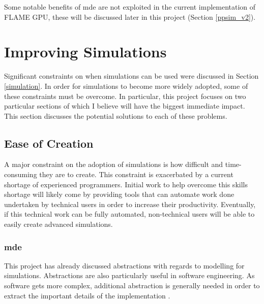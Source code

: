 \documentclass{UoYCSproject}
\begin{document}
Some notable benefits of \gls{mde} are not exploited in the current implementation of \gls{FLAME GPU}, these will be discussed later in this project (Section \ref{ppsim_v2}).

\section{Improving Simulations}
\label{improvements}
Significant constraints on when simulations can be used were discussed in Section \ref{simulation}.
In order for simulations to become more widely adopted, some of these constraints must be overcome. 
In particular, this project focuses on two particular sections of which I believe will have the biggest immediate impact.
This section discusses the potential solutions to each of these problems.

\subsection{Ease of Creation}
\label{ease-of-creation}
A major constraint on the adoption of simulations is how difficult and time-consuming they are to create.
This constraint is exacerbated by a current shortage of experienced programmers.
Initial work to help overcome this skills shortage will likely come by providing tools that can automate work done undertaken by technical users in order to increase their productivity.
Eventually, if this technical work can be fully automated, non-technical users will be able to easily create advanced simulations.



\subsubsection{\acrlong{mde}}
This project has already discussed abstractions with regards to modelling for simulations.
Abstractions are also particularly useful in software engineering.
As software gets more complex, additional abstraction is generally needed in order to extract the important details of the implementation \cite[p.24]{csapp}.
\end{document}
